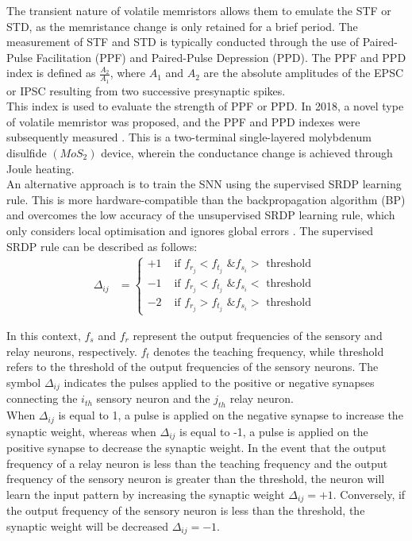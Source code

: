\noindent The transient nature of volatile memristors allows them to emulate the STF or STD, as the memristance change is only retained for a brief period. The measurement of STF and STD is typically conducted through the use of Paired-Pulse Facilitation (PPF) and Paired-Pulse Depression (PPD). The PPF and PPD index is defined as $\frac{A_2}{A_1}$, where $A_1$ and $A_2$ are the absolute amplitudes of the EPSC or IPSC resulting from two successive presynaptic spikes. \\

\noindent This index is used to evaluate the strength of PPF or PPD. In 2018, a novel type of volatile memristor was proposed, and the PPF and PPD indexes were subsequently measured \cite{sun2018synaptic}. This is a two-terminal single-layered molybdenum disulfide $(MoS_2)$ device, wherein the conductance change is achieved through Joule heating. \\

\noindent An alternative approach is to train the SNN using the supervised SRDP learning rule. This is more hardware-compatible than the backpropagation algorithm (BP) and overcomes the low accuracy of the unsupervised SRDP learning rule, which only considers local optimisation and ignores global errors \cite{pfeiffer2018deep}. The supervised SRDP rule can be described as follows:
\begin{align}
\Delta_{ij} &= \begin{cases}
+1 & \text{ if } f_{r_j} < f_{t_j} \text{ \& } f_{s_i} > \text{ threshold }\\ 
-1 & \text{ if } f_{r_j} < f_{t_j} \text{ \& } f_{s_i} < \text{ threshold } \\
-2 & \text{ if } f_{r_j} > f_{t_j} \text{ \& } f_{s_i} > \text{ threshold }
\end{cases} \label{eq:4.12}
\end{align}

\noindent In this context, $f_s$ and $f_r$ represent the output frequencies of the sensory and relay neurons, respectively. $f_t$ denotes the teaching frequency, while threshold refers to the threshold of the output frequencies of the sensory neurons. The symbol $\Delta_{ij}$ indicates the pulses applied to the positive or negative synapses connecting the $i_{th}$ sensory neuron and the $j_{th}$ relay neuron. \\

\noindent When $\Delta_{ij}$ is equal to 1, a pulse is applied on the negative synapse to increase the synaptic weight, whereas when $\Delta_{ij}$ is equal to -1, a pulse is applied on the positive synapse to decrease the synaptic weight. In the event that the output frequency of a relay neuron is less than the teaching frequency and the output frequency of the sensory neuron is greater than the threshold, the neuron will learn the input pattern by increasing the synaptic weight $\Delta_{ij} = +1$. Conversely, if the output frequency of the sensory neuron is less than the threshold, the synaptic weight will be decreased $\Delta_{ij} = -1$. \\


